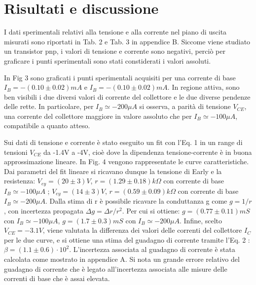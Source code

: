 \documentclass[a4paper,11pt]{article}
\begin{document}
\section{Risultati e discussione}

I dati sperimentali relativi alla tensione e alla corrente nel piano di uscita misurati sono riportati in Tab. 2 e Tab. 3 in appendice B.
Siccome viene studiato un transistor pnp, i valori di tensione e corrente sono negativi, perciò per graficare i punti sperimentali sono stati constiderati i valori assoluti.

In Fig 3 sono graficati i punti sperimentali acquisiti per una corrente di base $I_B = -(0.10 \pm 0.02) mA$ e $ I_B = - (0.10 \pm 0.02) mA$.
In regione attiva, sono ben visibili i due diversi valori di corrente del collettore e le due diverse pendenze delle rette. In particolare, per $I_B \simeq -200 \mu A$ si osserva, a parità di tensione $V_{CE}$, una corrente del collettore maggiore in valore assoluto che per $I_B \simeq - 100 \mu A$, compatibile a quanto atteso.

Sui dati di tensione e corrente è stato eseguito un fit con l'Eq. 1 in un range di tensioni $V_{CE}$ da -1.4V a -4V, cioè dove la dipendenza tensione-corrente è in buona approssimazione lineare. In Fig. 4 vengono rappresentate le curve caratteristiche.
Dai parametri del fit lineare si ricavano dunque la tensione di Early e la resistenza: $V_{ey} = (20 \pm 3) V$, $r = (1.29 \pm 0.18) k\Omega$ con corrente di base  $I_B \simeq -100 \mu A$ ; $V_{ey} = (14 \pm 3) V$, $r = (0.59 \pm 0.09) k\Omega$ con corrente di base $I_B \simeq -200 \mu A$.
Dalla stima di r è possibile ricavare la conduttanza g come $g = 1/r$, con incertezza propagata $\Delta g = \Delta r/ r^2$. Per cui si ottiene: $g = (0.77 \pm 0.11) mS$ con $I_B \simeq -100 \mu A$, $g = (1.7 \pm 0.3)mS$ con $I_B \simeq -200 \mu A$.
Infine, scelto $V_{CE} = -3.1 V$, viene valutata la differenza dei valori delle correnti del collettore $I_C$ per le due curve, e si ottiene una stima del guadagno di corrente tramite l'Eq. 2  : $\beta =(1.1 \pm 0.6) \cdot 10^2$. L'incertezza associata al guadagno di corrente è stata calcolata come mostrato in appendice A. Si nota un grande errore relativo del guadagno di corrente che è legato all'incertezza associata alle misure delle correnti di base che è assai elevata.
\end{document}
